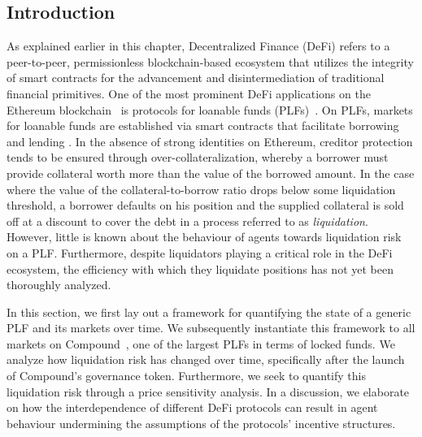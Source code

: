 \subsection{Introduction}
\label{sec:5b:introduction}

As explained earlier in this chapter, Decentralized Finance (DeFi) refers to a peer-to-peer, permissionless blockchain-based ecosystem that utilizes the integrity of smart contracts for the advancement and disintermediation of traditional financial primitives. 
One of the most prominent DeFi applications on the Ethereum blockchain~\cite{wood2014ethereum} is protocols for loanable funds (PLFs)~\cite{10.1145/3419614.3423254}.
On PLFs, markets for loanable funds are established via smart contracts that facilitate borrowing and lending \cite{10.1145/3570639}.
In the absence of strong identities on Ethereum, creditor protection tends to be ensured through over-collateralization, whereby a borrower must provide collateral worth more than the value of the borrowed amount.
In the case where the value of the collateral-to-borrow ratio drops below some liquidation threshold, a borrower defaults on his position and the supplied collateral is sold off at a discount to cover the debt in a process referred to as \textit{liquidation}.
However, little is known about the behaviour of agents towards liquidation risk on a PLF.
Furthermore, despite liquidators playing a critical role in the DeFi ecosystem, the efficiency with which they liquidate positions has not yet been thoroughly analyzed.

In this section, we first lay out a framework for quantifying the state of a generic PLF and its markets over time. 
We subsequently instantiate this framework to all markets on Compound~\cite{leshner2018}, one of the largest PLFs in terms of locked funds.
We analyze how liquidation risk has changed over time, specifically after the launch of Compound's governance token.
Furthermore, we seek to quantify this liquidation risk through a price sensitivity analysis.
In a discussion, we elaborate on how the interdependence of different DeFi protocols can result in agent behaviour undermining the assumptions of the protocols' incentive structures.

